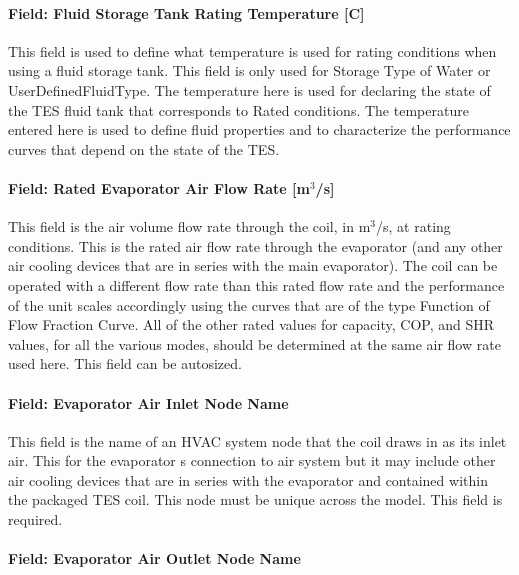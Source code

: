 \paragraph{Field: Fluid Storage Tank Rating Temperature {[}C{]}}\label{field-fluid-storage-tank-rating-temperature-c}

This field is used to define what temperature is used for rating conditions when using a fluid storage tank. This field is only used for Storage Type of Water or UserDefinedFluidType. The temperature here is used for declaring the state of the TES fluid tank that corresponds to Rated conditions. The temperature entered here is used to define fluid properties and to characterize the performance curves that depend on the state of the TES.

\paragraph{\texorpdfstring{Field: Rated Evaporator Air Flow Rate {[}m\(^{3}\)/s{]}}{Field: Rated Evaporator Air Flow Rate {[}m\^{}\{3\}/s{]}}}\label{field-rated-evaporator-air-flow-rate-m3s}

This field is the air volume flow rate through the coil, in m\(^{3}\)/s, at rating conditions. This is the rated air flow rate through the evaporator (and any other air cooling devices that are in series with the main evaporator). The coil can be operated with a different flow rate than this rated flow rate and the performance of the unit scales accordingly using the curves that are of the type Function of Flow Fraction Curve. All of the other rated values for capacity, COP, and SHR values, for all the various modes, should be determined at the same air flow rate used here. This field can be autosized.

\paragraph{Field: Evaporator Air Inlet Node Name}\label{field-evaporator-air-inlet-node-name-3}

This field is the name of an HVAC system node that the coil draws in as its inlet air. This for the evaporator s connection to air system but it may include other air cooling devices that are in series with the evaporator and contained within the packaged TES coil. This node must be unique across the model. This field is required.

\paragraph{Field: Evaporator Air Outlet Node Name}\label{field-evaporator-air-outlet-node-name-2}

